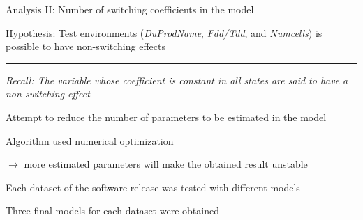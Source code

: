 \documentclass{beamer}
\begin{document}
\begin{frame}[fragile]
Analysis II: Number of switching coefficients in the model

Hypothesis: Test environments (\textit{DuProdName}, \textit{Fdd/Tdd}, and \textit{Numcells}) is possible to have non-switching effects
\rule{\textwidth}{0.4pt}

\begin{itemize}
\item \small{\textit{Recall: The variable whose coefficient is \textit{constant} in all states are said to have a non-switching effect}}

\item \normalsize{Attempt to reduce the number of parameters to be estimated in the model
\item Algorithm used numerical optimization

$\rightarrow$ more estimated parameters will make the obtained result unstable 

\item Each dataset of the software release was tested with different models
\item Three final models for each dataset were obtained}
\end{itemize}

\end{frame}
\end{document}
